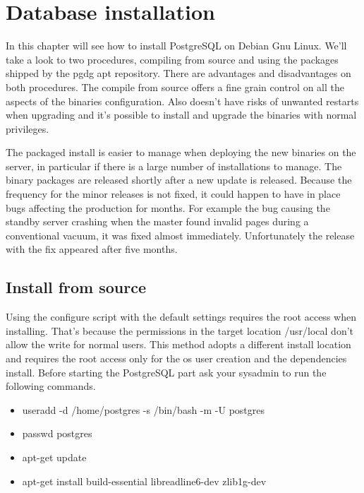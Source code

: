 \chapter{Database installation}
\label{cha:DB_INSTALL}
In this chapter will see how to install PostgreSQL on Debian Gnu Linux. We'll take a look to 
two procedures, compiling from source and using the packages shipped by the pgdg 
 apt repository.\newline 
There are advantages and disadvantages on both procedures. The compile from source offers a fine
grain control on all the aspects of the binaries configuration. Also doesn't have risks of
unwanted restarts when upgrading and it's possible to install and upgrade the binaries with normal
privileges.\newline

The packaged install is easier to manage when deploying the new binaries on the server, in
particular if there is a large number of installations to manage. The binary packages are
released shortly after a new update is released. Because the frequency for the minor
releases is not fixed, it could happen to have in place bugs affecting the production for months.
For example the bug causing the standby server crashing when the master found invalid pages during
a conventional vacuum, it was fixed almost immediately. Unfortunately the release with the fix
appeared after five months.\newline


\section{Install from source}
Using the configure script with the default settings requires the root access when installing.
That's because the permissions in the target location /usr/local don't allow the write for normal
users. This method adopts a different install location and requires the root access only for the os
user creation and the dependencies install. 
Before starting the PostgreSQL part ask your sysadmin to run the following commands.

\begin{itemize}

 \item useradd -d /home/postgres -s /bin/bash -m -U postgres
 \item passwd postgres 
 \item apt-get update
 \item apt-get install build-essential  libreadline6-dev  zlib1g-dev
\end{itemize}

